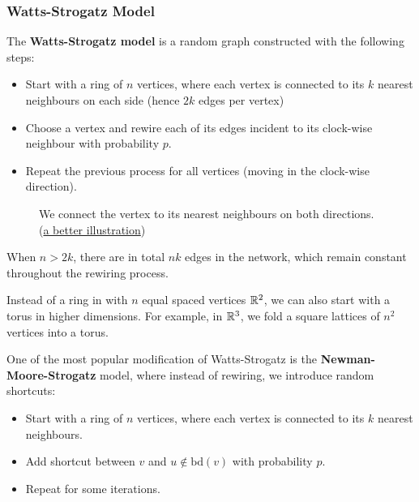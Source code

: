 \documentclass{article}
\begin{document}
\subsubsection{Watts-Strogatz Model}
The \textbf{Watts-Strogatz model} is a random graph constructed with the following steps:
\begin{itemize}
    \item Start with a ring of $n$ vertices, where each vertex is connected to its $k$ nearest neighbours on each side (hence $2k$ edges per vertex)
    \item Choose a vertex and rewire each of its edges incident to its clock-wise neighbour with probability $p$.
    \item Repeat the previous process for all vertices (moving in the clock-wise direction).
\end{itemize}

\begin{figure}[H]
    \centering
    \caption{We connect the vertex to its nearest neighbours on both directions. (\href{https://www.kth.se/social/files/5605669af2765468be471eda/lecture\%204\%20\%282015\%29.pdf}{a better illustration})}
    \label{fig:watts-strogatz}
\end{figure}

When $n>2k$, there are in total $nk$ edges in the network, which remain constant throughout the rewiring process.

\begin{remark}
    Instead of a ring in with $n$ equal spaced vertices $\mathbb{R}^2$, we can also start with a torus in higher dimensions. For example, in $\mathbb{R}^3$, we fold a square lattices of $n^2$ vertices into a torus.
\end{remark}  

One of the most popular modification of Watts-Strogatz is the \textbf{Newman-Moore-Strogatz} model, where instead of rewiring, we introduce random shortcuts:
\begin{itemize}
    \item Start with a ring of $n$ vertices, where each vertex is connected to its $k$ nearest neighbours.
    \item Add shortcut between $v$ and $u\notin \text{bd}(v)$ with probability $p$.
    \item Repeat for some iterations.
\end{itemize}
\end{document}
